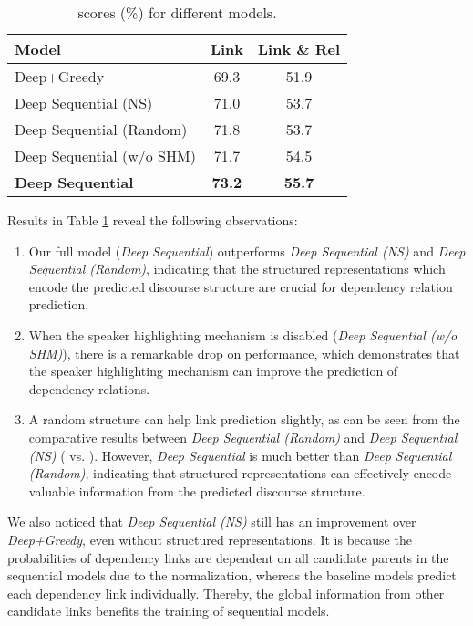 \documentclass[letterpaper]{article} \usepackage{aaai19}  \usepackage{times}  \usepackage{helvet}  \usepackage{courier}  \usepackage{url}  \usepackage{graphicx}  \usepackage{amssymb}
\begin{document}
\begin{table}[ht]
  \centering
  \begin{tabular}{l|c|c}
    \hline
    Model & Link & Link \& Rel \\
    \hline
    Deep+Greedy & 69.3 & 51.9 \\
    \hline
    Deep Sequential (NS) & 71.0 & 53.7 \\
    Deep Sequential (Random) & 71.8 & 53.7 \\
    Deep Sequential (w/o SHM) & 71.7 & 54.5 \\
    \hline
    \textbf{Deep Sequential} & \textbf{73.2} & \textbf{55.7} \\
    \hline
  \end{tabular}
  \caption{ scores (\%) for different models. }
  \label{results_variants}
\end{table}

Results in Table \ref{results_variants} reveal the following observations:

\begin{enumerate}

\item Our full model (\textit{Deep Sequential}) outperforms \emph{Deep Sequential (NS)} and \emph{Deep Sequential (Random)}, indicating that the structured representations which encode the predicted discourse structure are crucial for dependency relation prediction.
    
\item When the speaker highlighting mechanism is disabled (\emph{Deep Sequential (w/o SHM)}), there is a remarkable drop on performance, which demonstrates that the speaker highlighting mechanism can improve the prediction of dependency relations.

\item A random structure can help link prediction slightly, as can be seen from the comparative results between \emph{Deep Sequential (Random)} and \emph{Deep Sequential (NS)} ( vs. ).
However, \emph{Deep Sequential} is much better than \emph{Deep Sequential (Random)}, indicating that structured representations can effectively encode valuable information from the predicted discourse structure.
\end{enumerate}    
    
We also noticed that \emph{Deep Sequential (NS)} still has an improvement over \emph{Deep+Greedy}, even without structured representations.
It is because the probabilities of dependency links are dependent on all candidate parents in the sequential models due to the  normalization, whereas the baseline models predict each dependency link individually.
Thereby, the global information from other candidate links benefits the training of sequential models.
\end{document}

